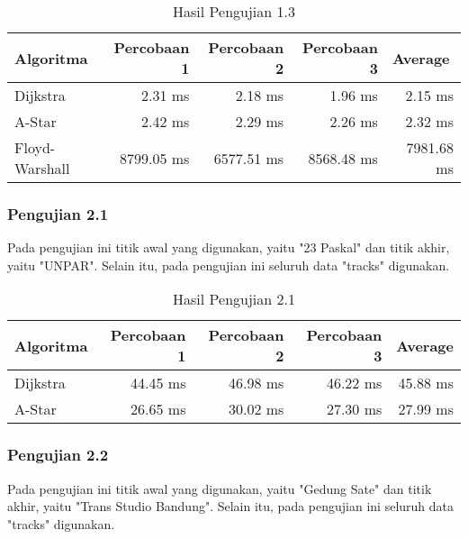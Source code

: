 \begin{table}[H]
\centering
\caption{Hasil Pengujian 1.3}
\label{tab:hasiluji1.3}
{\large
\begin{tabular}{|l|r|r|r|r|}
\hline
\textbf{Algoritma} & \textbf{Percobaan 1} & \textbf{Percobaan 2} & \textbf{Percobaan 3} & \multicolumn{1}{l|}{\textbf{Average}}\\ \hline
Dijkstra           & 2.31 ms              & 2.18 ms             & 1.96 ms      &    2.15 ms           \\ \hline
A-Star            & 2.42 ms              & 2.29 ms              & 2.26 ms      &    2.32 ms        \\ \hline
Floyd-Warshall     & 8799.05 ms              & 6577.51 ms               & 8568.48 ms      &     7981.68 ms        \\ \hline
\end{tabular}
}
\end{table}

\subsubsection{Pengujian 2.1}
Pada pengujian ini titik awal yang digunakan, yaitu "23 Paskal" dan titik akhir, yaitu "UNPAR". Selain itu, pada pengujian ini seluruh data "tracks" digunakan.

\begin{table}[H]
\centering
\caption{Hasil Pengujian 2.1}
\label{tab:hasiluji2.1}
{\large
\begin{tabular}{|l|r|r|r|r|}
\hline
\textbf{Algoritma} & \textbf{Percobaan 1} & \textbf{Percobaan 2} & \textbf{Percobaan 3} & {\textbf{Average}}\\ \hline
Dijkstra           & 44.45 ms              & 46.98 ms             & 46.22 ms     &      45.88 ms         \\ \hline
A-Star            & 26.65 ms              & 30.02 ms              & 27.30 ms      &      27.99 ms        \\ \hline
\end{tabular}
}
\end{table}

\subsubsection{Pengujian 2.2}
Pada pengujian ini titik awal yang digunakan, yaitu "Gedung Sate" dan titik akhir, yaitu "Trans Studio Bandung". Selain itu, pada pengujian ini seluruh data "tracks" digunakan.

